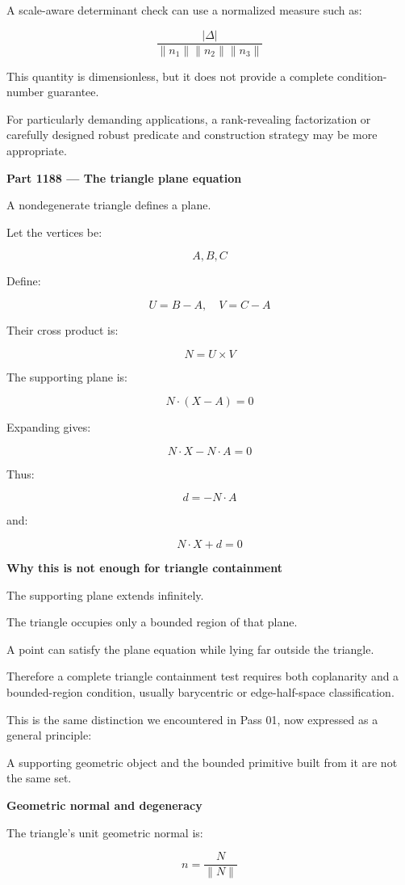 A scale-aware determinant check can use a normalized measure such as:

\[
\frac{|\Delta|} {\|n_1\|\|n_2\|\|n_3\|}
\]

This quantity is dimensionless, but it does not provide a complete condition-number guarantee.

For particularly demanding applications, a rank-revealing factorization or carefully designed robust predicate and construction strategy may be more appropriate.

\textbf{Part 1188 --- The triangle plane equation}

A nondegenerate triangle defines a plane.

Let the vertices be:

\[
A,B,C
\]

Define:

\[
U=B-A,\quad V=C-A
\]

Their cross product is:

\[
N=U\times V
\]

The supporting plane is:

\[
\boxed{ N\cdot(X-A)=0 }
\]

Expanding gives:

\[
\boxed{ N\cdot X-N\cdot A=0 }
\]

Thus:

\[
d=-N\cdot A
\]

and:

\[
\boxed{ N\cdot X+d=0 }
\]

\textbf{Why this is not enough for triangle containment}

The supporting plane extends infinitely.

The triangle occupies only a bounded region of that plane.

A point can satisfy the plane equation while lying far outside the triangle.

Therefore a complete triangle containment test requires both coplanarity and a bounded-region condition, usually barycentric or edge-half-space classification.

This is the same distinction we encountered in Pass 01, now expressed as a general principle:

A supporting geometric object and the bounded primitive built from it are not the same set.

\textbf{Geometric normal and degeneracy}

The triangle's unit geometric normal is:

\[
n=\frac{N}{\|N\|}
\]

